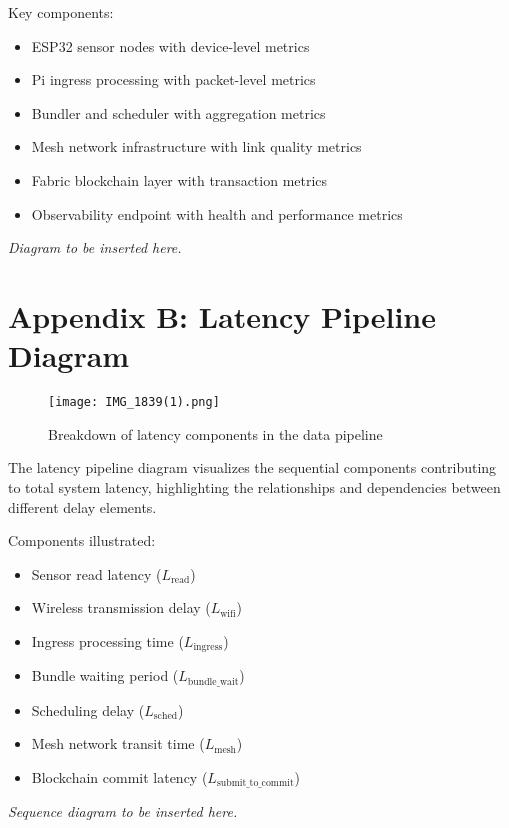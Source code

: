 \documentclass[12pt]{article}
\begin{document}
Key components:
\begin{itemize}
    \item ESP32 sensor nodes with device-level metrics
    \item Pi ingress processing with packet-level metrics
    \item Bundler and scheduler with aggregation metrics
    \item Mesh network infrastructure with link quality metrics
    \item Fabric blockchain layer with transaction metrics
    \item Observability endpoint with health and performance metrics
\end{itemize}

\textit{Diagram to be inserted here.}

\section{Appendix B: Latency Pipeline Diagram}
\label{app:latency}

\begin{figure}[H]
    \centering
    \texttt{[image: IMG\_1839(1).png]} %
    \caption{Breakdown of latency components in the data pipeline}
    \label{fig:latency-pipeline}
\end{figure}

The latency pipeline diagram visualizes the sequential components contributing to total system latency, highlighting the relationships and dependencies between different delay elements.

Components illustrated:
\begin{itemize}
    \item Sensor read latency ($L_{\text{read}}$)
    \item Wireless transmission delay ($L_{\text{wifi}}$)
    \item Ingress processing time ($L_{\text{ingress}}$)
    \item Bundle waiting period ($L_{\text{bundle\_wait}}$)
    \item Scheduling delay ($L_{\text{sched}}$)
    \item Mesh network transit time ($L_{\text{mesh}}$)
    \item Blockchain commit latency ($L_{\text{submit\_to\_commit}}$)
\end{itemize}

\textit{Sequence diagram to be inserted here.}
\end{document}
